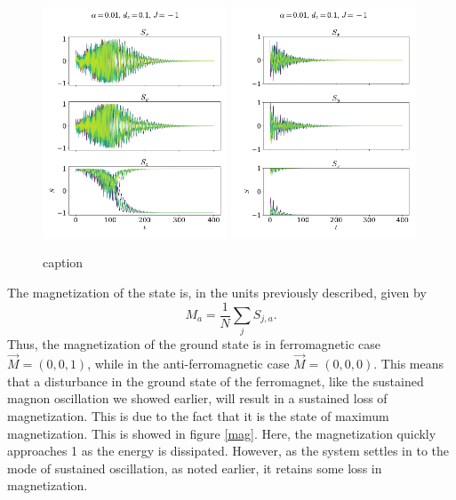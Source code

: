 \documentclass{article}
\begin{document}
    \begin{figure}
        \centering
        \includegraphics[width=0.49\textwidth]{../plots/2225.pdf}
        \includegraphics[width=0.49\textwidth]{../plots/22252.pdf}
        \caption{caption}
        \label{one tilted dampend af}
    \end{figure}

    The magnetization of the state is, in the units previously described, given by
    \begin{equation*}
        M_a = \frac{1}{N} \sum_j S_{j, a}.
    \end{equation*}
    Thus, the magnetization of the ground state is in ferromagnetic case $\vec M = (0, 0, 1)$, while in the anti-ferromagnetic case $\vec M = (0, 0, 0)$. This means that a disturbance in the ground state of the ferromagnet, like the sustained magnon oscillation we showed earlier, will result in a sustained loss of magnetization. This is due to the fact that it is the state of maximum magnetization. This is showed in figure \ref{mag}. Here, the magnetization quickly approaches 1 as the energy is dissipated. However, as the system settles in to the mode of sustained oscillation, as noted earlier, it retains some loss in magnetization. 
\end{document}
